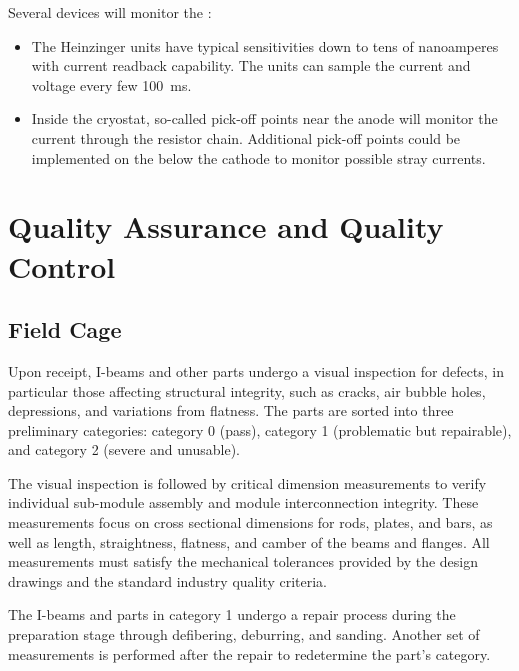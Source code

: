 Several devices will monitor the :  
\begin{itemize}
\item The Heinzinger units have typical sensitivities down to tens of nanoamperes with current readback capability.  The units can sample the current and voltage every few \SI{100}{\milli\s}.  
\item Inside the cryostat, so-called pick-off points near the anode will monitor the current through the  resistor chain. Additional pick-off points could be implemented on the  below the cathode to monitor possible stray currents.
\end{itemize}


\section{Quality Assurance and Quality Control}
\label{sec:fddp-hv-qa}

\subsection{Field Cage}

Upon receipt,  I-beams and other parts undergo a visual inspection for defects, in particular those affecting structural integrity, such as cracks, air bubble holes, depressions, and variations from flatness. The parts are sorted into three preliminary categories: category 0 (pass), category 1 (problematic but repairable), and category 2 (severe and unusable).

The visual inspection is followed by critical dimension measurements to verify individual sub-module assembly and module interconnection integrity.  These measurements focus on cross sectional dimensions for rods, plates, and bars, as well as length, straightness, flatness, and camber of the beams and flanges.
All measurements must satisfy the mechanical tolerances provided by the design drawings and the standard industry quality criteria.

The  I-beams and parts in category 1 undergo a repair process during the preparation stage through defibering, deburring, and sanding.  Another set of measurements is performed after the repair to redetermine the part's category.

